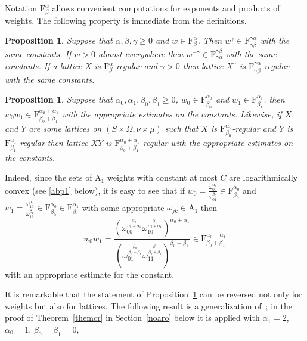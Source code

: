 \documentclass[12pt]{amsart}
\newtheorem {proposition} [theorem] {Proposition}
\newcommand {\apclass} [1] {\ensuremath{\mathrm A_{#1}}}
\newcommand {\frclass} [2] {\ensuremath{\mathrm F^{#1}_{#2}}}
\newcommand {\weightw} {\ensuremath {\mathit w}}
\begin{document}
Notation $\frclass {\alpha} {\beta}$ allows convenient computations for exponents and products of weights.
The following property is immediate from the definitions.
\begin {proposition}
\label {frappower}
Suppose that $\alpha, \beta, \gamma \geqslant 0$ and $\weightw \in \frclass {\alpha} {\beta}$.
Then $\weightw^\gamma \in \frclass {\gamma \alpha} {\gamma \beta}$ with the same constants.
If $\weightw > 0$ almost everywhere then $\weightw^{-\gamma} \in \frclass {\gamma \beta} {\gamma \alpha}$
with the same constants.
If a lattice $X$ is $\frclass {\alpha} {\beta}$-regular and $\gamma > 0$ then lattice $X^\gamma$ is 
$\frclass {\gamma \alpha} {\gamma \beta}$-regular with the same constants.
\end {proposition}
\begin {proposition}
\label {frapmult}
Suppose that $\alpha_0, \alpha_1, \beta_0, \beta_1 \geqslant 0$,
$\weightw_0 \in \frclass {\alpha_0} {\beta_0}$ and $\weightw_1 \in \frclass {\alpha_1} {\beta_1}$.
then $\weightw_0 \weightw_1 \in \frclass {\alpha_0 + \alpha_1} {\beta_0 + \beta_1}$ with the appropriate estimates
on the constants.
Likewise, if $X$ and $Y$ are some lattices on $(S \times \Omega, \nu \times \mu)$
such that $X$ is $\frclass {\alpha_0} {\beta_0}$-regular and $Y$ is $\frclass {\alpha_1} {\beta_1}$-regular
then lattice $X Y$ is $\frclass {\alpha_0 + \alpha_1} {\beta_0 + \beta_1}$-regular
with the appropriate estimates on the constants.
\end {proposition}
Indeed, since the sets of $\apclass {1}$ weights with constant at most $C$
are logarithmically convex (see \eqref {abp1} below), it is easy to see that
if $\weightw_0 = \frac {\omega_{00}^{\alpha_0}} {\omega_{01}^{\beta_0}} \in \frclass {\alpha_0} {\beta_0}$ and
$\weightw_1 = \frac {\omega_{10}^{\alpha_1}} {\omega_{11}^{\beta_1}} \in
\frclass {\alpha_0} {\beta_0}\in \frclass {\alpha_1} {\beta_1}$
with some appropriate $\omega_{jk} \in \apclass {1}$
then
$$
\weightw_0 \weightw_1 =
\frac {\left(\omega_{00}^{\frac {\alpha_0} {\alpha_0 + \alpha_1}} \omega_{10}^{\frac {\alpha_1} {\alpha_0 + \alpha_1}} \right)^{\alpha_0 + \alpha_1}}
 {\left(\omega_{01}^{\frac {\beta_0} {\beta_0 + \beta_1}} \omega_{11}^{\frac {\beta_1} {\beta_0 + \beta_1}} \right)^{\beta_0 + \beta_1}}
\in \frclass {\alpha_0 + \alpha_1}
{\beta_0 + \beta_1}
$$
with an appropriate estimate for the constant.

It is remarkable that the statement of Proposition~\ref {frapmult} can be reversed not only for weights
but also for lattices.
The following result is a generalization of~\cite [Theorem~2] {rutsky2011en};
in the proof of Theorem~\ref {themcr} in Section~\ref {noaro} below it is applied
with $\alpha_1 = 2$, $\alpha_0 = 1$, $\beta_0 = \beta_1 = 0$,
\end{document}

